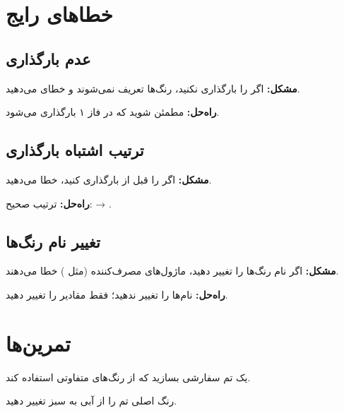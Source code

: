 \section{خطاهای رایج}
\label{sec:themes-mistakes}

\subsection{عدم بارگذاری }
\label{sec:themes-mistake-colors}

\textbf{مشکل:} اگر  را
بارگذاری نکنید، رنگ‌ها تعریف نمی‌شوند و
خطای  می‌دهید.

\textbf{راه‌حل:} مطمئن شوید که
 در فاز ۱ 
بارگذاری می‌شود.

\subsection{ترتیب اشتباه بارگذاری}
\label{sec:themes-mistake-order}

\textbf{مشکل:} اگر  را
قبل از  بارگذاری کنید،
خطا می‌دهید.

\textbf{راه‌حل:} ترتیب صحیح:
 → .

\subsection{تغییر نام رنگ‌ها}
\label{sec:themes-mistake-rename}

\textbf{مشکل:} اگر نام رنگ‌ها را تغییر دهید،
ماژول‌های مصرف‌کننده (مثل )
خطا می‌دهند.

\textbf{راه‌حل:} نام‌ها را تغییر ندهید؛ فقط
مقادیر  را تغییر دهید.

\section{تمرین‌ها}
\label{sec:themes-exercises}

\begin{exercise}
    یک تم سفارشی بسازید که از رنگ‌های
    متفاوتی استفاده کند.
    \label{exc:themes-custom}
\end{exercise}

\begin{exercise}
    رنگ اصلی تم را از آبی به سبز تغییر
    دهید.
    \label{exc:themes-green}
\end{exercise}

